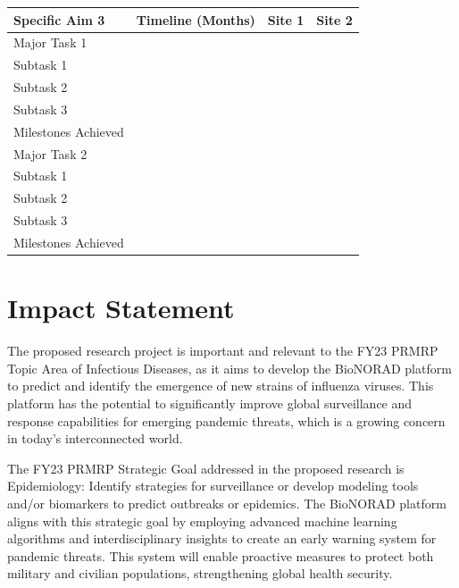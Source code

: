 \documentclass[onecolumn, compsoc,12pt]{IEEEtran}
\begin{document}
\begin{center}

\begin{tabular}{|L{3.5in}|C{.75in}|C{.5in}|C{.5in}|}\hline
\bf Specific Aim 3 & \bf Timeline (Months)  & \bf Site 1 & \bf Site 2 \\\hline
{} Major Task 1 &  & & \\\hline
Subtask 1 &  & & \\\hline
Subtask 2 &  & & \\\hline
  Subtask 3 &  & & \\\hline
  Milestones Achieved & & & \\\hline
  Major Task 2 & & & \\\hline
Subtask 1 &  & & \\\hline
Subtask 2 &  & & \\\hline
  Subtask 3 &  & & \\\hline
  Milestones Achieved & & & \\\hline 
\end{tabular}
\end{center}





\clearpage
{}
\section*{Impact Statement}

The proposed research project is important and relevant to the FY23 PRMRP Topic Area of Infectious Diseases, as it aims to develop the BioNORAD platform to predict and identify the emergence of new strains of influenza viruses. This platform has the potential to significantly improve global surveillance and response capabilities for emerging pandemic threats, which is a growing concern in today's interconnected world.

The FY23 PRMRP Strategic Goal addressed in the proposed research is Epidemiology: Identify strategies for surveillance or develop modeling tools and/or biomarkers to predict outbreaks or epidemics. The BioNORAD platform aligns with this strategic goal by employing advanced machine learning algorithms and interdisciplinary insights to create an early warning system for pandemic threats. This system will enable proactive measures to protect both military and civilian populations, strengthening global health security.
\end{document}
